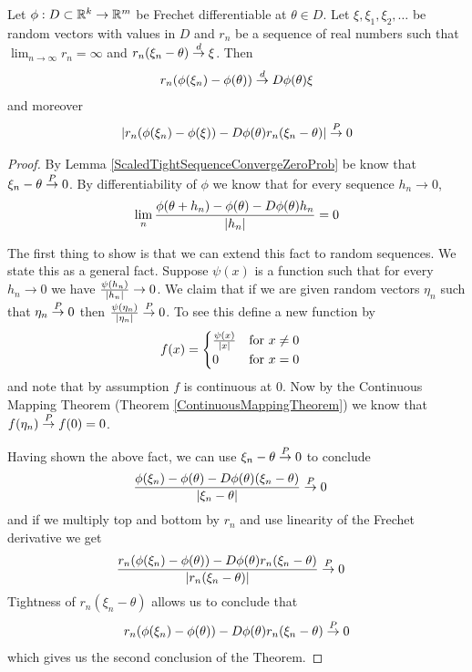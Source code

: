 \begin{thm}\label{DeltaMethod}Let $\phi : D \subset
  \mathbb{R}^k \to \mathbb{R}^m$ be Frechet differentiable at $\theta \in D$.  Let
  $\xi, \xi_1, \xi_2, \dots$ be random vectors with values in $D$ and $r_n$ be a sequence
  of real numbers such that $\lim_{n \to \infty} r_n = \infty$ and
  $r_n(\xi_n - \theta) \overset{d}\to \xi$.  Then 
\begin{align*}
r_n(\phi(\xi_n) -
  \phi(\theta)) \overset{d}\to D\phi(\theta) \xi
\end{align*}
and moreover 
\begin{align*}
\left \vert r_n(\phi(\xi_n) - \phi(\xi)) - D\phi(\theta) r_n(\xi_n - \theta) \right \vert \overset{P}\to 0
\end{align*}
\end{thm}
\begin{proof}
By Lemma \ref{ScaledTightSequenceConvergeZeroProb} be know that $\xi_n
- \theta
\overset{P}\to 0$.  By differentiability of $\phi$ we know that  for every
sequence $h_n \to 0$,
\begin{align*}
\lim_n \frac{\phi(\theta + h_n) - \phi(\theta) - D\phi(\theta)h_n}{\left \vert h_n \right \vert} = 0
\end{align*}

The first thing to show is that we can extend this fact to random
sequences.  We state this as a general fact.  Suppose $\psi(x)$ is a
function such that for every $h_n \to 0$ we have
$\frac{\psi(h_n)}{\left \vert h_n \right \vert} \to 0$.  We claim that if we are given
random vectors $\eta_n$ such that $\eta_n \overset{P}\to 0$ then
$\frac{\psi(\eta_n)}{\left \vert \eta_n \right \vert} \overset{P}\to 0$.  To see this define a
new function by 
\begin{align*}
f(x) &= \begin{cases}
\frac{\psi(x)}{\left \vert x \right \vert} & \text{for $x \neq 0$} \\
0 & \text{for $x=0$}
\end{cases}
\end{align*}
and note that by assumption $f$ is continuous at $0$.  Now by the
Continuous Mapping Theorem (Theorem \ref{ContinuousMappingTheorem}) we know that $f(\eta_n)
\overset{P}\to f(0) = 0$.

Having shown the above fact, we can use $\xi_n - \theta \overset{P}\to 0$ to
conclude
\begin{align*}
\frac{\phi(\xi_n) - \phi(\theta) - D\phi(\theta) (\xi_n -
  \theta)}{\left \vert \xi_n - \theta \right \vert} &\overset{P}\to 0
\end{align*}
and if we multiply top and bottom by $r_n$ and use linearity of the
Frechet derivative we get
\begin{align*}
\frac{r_n(\phi(\xi_n) - \phi(\theta)) - D\phi(\theta) r_n(\xi_n -
  \theta)}{\left \vert r_n(\xi_n - \theta) \right \vert}  &\overset{P}\to 0
\end{align*}
Tightness of $r_n(\xi_n - \theta)$ allows us to conclude that 
\begin{align*}
r_n(\phi(\xi_n) - \phi(\theta)) - D\phi(\theta) r_n(\xi_n -  \theta)  \overset{P}\to 0
\end{align*}
which gives us the second conclusion of the Theorem.


\end{proof}

